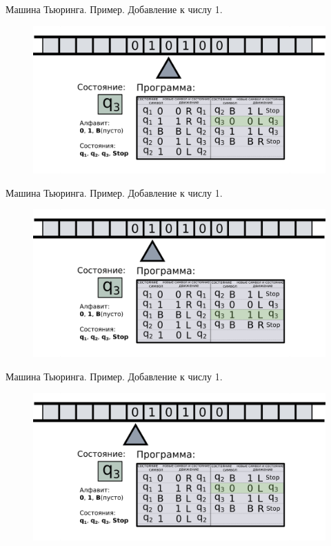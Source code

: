 \documentclass[newPxFont]{beamer}
\begin{document}
\begin{frame}{Машина Тьюринга. Пример. Добавление к числу 1.}
	\begin{figure}
		\centerline{\includegraphics[width=1.5\linewidth]{images/tm_ex_12.png}}
	\end{figure}
\end{frame}


\begin{frame}{Машина Тьюринга. Пример. Добавление к числу 1.}
	\begin{figure}
		\centerline{\includegraphics[width=1.5\linewidth]{images/tm_ex_13.png}}
	\end{figure}
\end{frame}


\begin{frame}{Машина Тьюринга. Пример. Добавление к числу 1.}
	\begin{figure}
		\centerline{\includegraphics[width=1.5\linewidth]{images/tm_ex_14.png}}
	\end{figure}
\end{frame}
\end{document}

